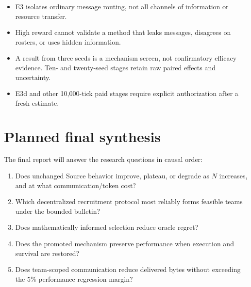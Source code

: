 \documentclass[11pt]{article}
\newcommand{\code}[1]{\texttt{#1}}
\begin{document}
\begin{itemize}
  reservation and resolution: two anchor files per logical provider call.
  This does not add model calls or tokens, but it adds local metadata and
  \code{fsync} latency.  Hosted v4 created 586 anchors for 293 calls.  The
  canary and promoted invocations took 24.412 and 89.432 seconds, but the
  design does not separately identify local durability overhead from provider
  and scheduling latency.
  \item E3 isolates ordinary message routing, not all channels of information
  or resource transfer.
  \item High reward cannot validate a method that leaks messages, disagrees on
  rosters, or uses hidden information.
  \item A result from three seeds is a mechanism screen, not confirmatory
  efficacy evidence.  Ten- and twenty-seed stages retain raw paired effects and
  uncertainty.
  \item E3d and other 10,000-tick paid stages require explicit authorization
  after a fresh estimate.
\end{itemize}

\section{Planned final synthesis}

The final report will answer the research questions in causal order:

\begin{enumerate}
  \item Does unchanged Source behavior improve, plateau, or degrade as $N$
  increases, and at what communication/token cost?
  \item Which decentralized recruitment protocol most reliably forms feasible
  teams under the bounded bulletin?
  \item Does mathematically informed selection reduce oracle regret?
  \item Does the promoted mechanism preserve performance when execution and
  survival are restored?
  \item Does team-scoped communication reduce delivered bytes without exceeding
  the 5\% performance-regression margin?
\end{enumerate}
\end{document}
